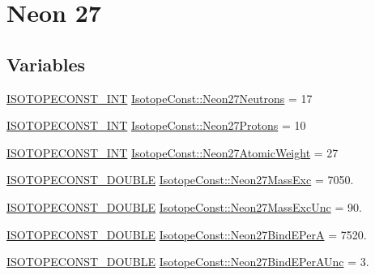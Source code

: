 \hypertarget{group___isotope_const-_neon-_ne27}{}\section{Neon 27}
\label{group___isotope_const-_neon-_ne27}
\subsection*{Variables}
\begin{DoxyCompactItemize}
\item 
\mbox{\hyperlink{group___isotope_const-_macros_ga5f18360b3e99483a35c32d789e62621c}{I\+S\+O\+T\+O\+P\+E\+C\+O\+N\+S\+T\+\_\+\+I\+NT}} \mbox{\hyperlink{group___isotope_const-_neon-_ne27_ga76f3e720a2988a2da39507581df8b511}{Isotope\+Const\+::\+Neon27\+Neutrons}} = 17
\item 
\mbox{\hyperlink{group___isotope_const-_macros_ga5f18360b3e99483a35c32d789e62621c}{I\+S\+O\+T\+O\+P\+E\+C\+O\+N\+S\+T\+\_\+\+I\+NT}} \mbox{\hyperlink{group___isotope_const-_neon-_ne27_ga9da47b25eabb1b55bf98ecb7d50e4226}{Isotope\+Const\+::\+Neon27\+Protons}} = 10
\item 
\mbox{\hyperlink{group___isotope_const-_macros_ga5f18360b3e99483a35c32d789e62621c}{I\+S\+O\+T\+O\+P\+E\+C\+O\+N\+S\+T\+\_\+\+I\+NT}} \mbox{\hyperlink{group___isotope_const-_neon-_ne27_gae1858338934f334313059c6c53c8766c}{Isotope\+Const\+::\+Neon27\+Atomic\+Weight}} = 27
\item 
\mbox{\hyperlink{group___isotope_const-_macros_ga8f45a7272ce02c0b4c65c44636ed719a}{I\+S\+O\+T\+O\+P\+E\+C\+O\+N\+S\+T\+\_\+\+D\+O\+U\+B\+LE}} \mbox{\hyperlink{group___isotope_const-_neon-_ne27_ga808d5bc9fadb74f54530b4c3055a7ee2}{Isotope\+Const\+::\+Neon27\+Mass\+Exc}} = 7050.
\item 
\mbox{\hyperlink{group___isotope_const-_macros_ga8f45a7272ce02c0b4c65c44636ed719a}{I\+S\+O\+T\+O\+P\+E\+C\+O\+N\+S\+T\+\_\+\+D\+O\+U\+B\+LE}} \mbox{\hyperlink{group___isotope_const-_neon-_ne27_ga63f9f4861da85b828b63f54ee9334a34}{Isotope\+Const\+::\+Neon27\+Mass\+Exc\+Unc}} = 90.
\item 
\mbox{\hyperlink{group___isotope_const-_macros_ga8f45a7272ce02c0b4c65c44636ed719a}{I\+S\+O\+T\+O\+P\+E\+C\+O\+N\+S\+T\+\_\+\+D\+O\+U\+B\+LE}} \mbox{\hyperlink{group___isotope_const-_neon-_ne27_ga7fee8e4afd3b6a9e15c75a193f1a6bcf}{Isotope\+Const\+::\+Neon27\+Bind\+E\+PerA}} = 7520.
\item 
\mbox{\hyperlink{group___isotope_const-_macros_ga8f45a7272ce02c0b4c65c44636ed719a}{I\+S\+O\+T\+O\+P\+E\+C\+O\+N\+S\+T\+\_\+\+D\+O\+U\+B\+LE}} \mbox{\hyperlink{group___isotope_const-_neon-_ne27_gaed104beec13c846cbe9da379534fe886}{Isotope\+Const\+::\+Neon27\+Bind\+E\+Per\+A\+Unc}} = 3.

\end{DoxyCompactItemize}
